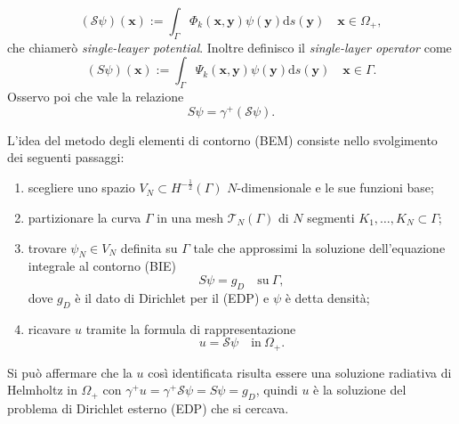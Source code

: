 \begin{equation}
	(\mathcal{S} \psi)(\textbf{x}) := \int_{\Gamma} \Phi_k(\textbf{x},\textbf{y}) \psi(\textbf{y}) \mathrm{d}s(\textbf{y}) \quad \textbf{x} \in \Omega_+,
\end{equation}
che chiamerò \textit{single-leayer potential}. Inoltre definisco il \textit{single-layer operator} come
\begin{equation}
	(S \psi) (\textbf{x}) := \int_\Gamma \Psi_k(\textbf{x},\textbf{y}) \psi(\textbf{y}) \mathrm{d}s(\textbf{y}) \quad \textbf{x} \in \Gamma.
\end{equation}
Osservo poi che vale la relazione
\begin{equation}
	S \psi = \gamma^+ (\mathcal{S} \psi).
\end{equation}

L'idea del metodo degli elementi di contorno (BEM) consiste nello svolgimento dei seguenti passaggi:
\begin{enumerate}
	\item scegliere uno spazio $V_N \subset H^{-\frac{1}{2}}(\Gamma)$ $N$-dimensionale e le sue funzioni base;
	\item partizionare la curva $\Gamma$ in una mesh $\mathcal{T}_N(\Gamma)$ di $N$ segmenti $K_1,\dots,K_N \subset \Gamma$;
	\item trovare $\psi_N \in V_N$ definita su $\Gamma$ tale che approssimi la soluzione dell'equazione integrale al contorno (BIE)
	\begin{equation} \label{BIE}
		S\psi = g_D \quad \text{su} \ \Gamma,
	\end{equation}
	dove $g_D$ è il dato di Dirichlet per il (EDP) e $\psi$ è detta densità;
	\item ricavare $u$ tramite la formula di rappresentazione
	\begin{equation}
		u = \mathcal{S} \psi \quad \text{in} \ \Omega_{+}.
	\end{equation}
\end{enumerate}
Si può affermare che la $u$ così identificata risulta essere una soluzione radiativa di Helmholtz in $\Omega_{+}$ con $\gamma^+ u = \gamma^+ \mathcal{S} \psi = S\psi = g_D$, quindi $u$ è la soluzione del problema di Dirichlet esterno (EDP) che si cercava.



